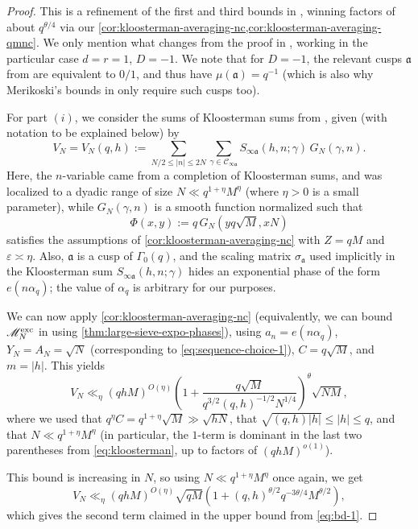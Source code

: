 \documentclass[reqno,11pt]{amsart}
\theoremstyle{remark}
\numberwithin{equation}{section}
\newcommand{\mC}{\mathcal{C}}
\newcommand{\ma}{\mathfrak{a}}
\newcommand{\eps}{\varepsilon}
\begin{document}
\begin{proof}
This is a refinement of the first and third bounds in \cite[Lemme 8.3]{de2020niveau}, winning factors of about $q^{\theta/4}$ via our \cref{cor:kloosterman-averaging-nc,cor:kloosterman-averaging-qmnc}. We only mention what changes from the proof in \cite[\S 8.1]{de2020niveau}, working in the particular case $d = r = 1$, $D = -1$. We note that for $D = -1$, the relevant cusps $\ma$ from \cite[\S 8.1]{de2020niveau} are equivalent to $0/1$, and thus have $\mu(\ma) = q^{-1}$ (which is also why Merikoski's bounds in \cite[\S 3.8]{merikoski2023largest} only require such cusps too). 

For part $(i)$, we consider the sums of Kloosterman sums from \cite[(8.30)]{de2020niveau}, given (with notation to be explained below) by
\[
    V_N = V_N(q, h) := \sum_{N/2 \le |n| \le 2N} \sum_{\gamma \in \mC_{\infty\ma}} S_{\infty\ma}(h, n; \gamma)\, G_N(\gamma, n).
\]
Here, the $n$-variable came from a completion of Kloosterman sums, and was localized to a dyadic range of size $N \ll q^{1+\eta} M^\eta$ (where $\eta > 0$ is a small parameter), while $G_N(\gamma, n)$ is a smooth function normalized such that
\[
    \Phi(x, y) := q\, G_N\left(yq\sqrt{M}, xN\right)
\]
satisfies the assumptions of \cref{cor:kloosterman-averaging-nc} with $Z = qM$ and $\eps \asymp \eta$. Also, $\ma$ is a cusp of $\Gamma_0(q)$, and the scaling matrix $\sigma_\ma$ used implicitly in the Kloosterman sum $S_{\infty\ma}(h, n; \gamma)$ hides an exponential phase of the form $e(n\alpha_q)$; the value of $\alpha_q$ is arbitrary for our purposes. 

We can now apply \cref{cor:kloosterman-averaging-nc} (equivalently, we can bound $\mathscr{M}_N^{\textnormal{exc}}$ in \cite[(8.40)]{de2020niveau} using \cref{thm:large-sieve-expo-phases}), using $a_n = e(n\alpha_q)$, $Y_N = A_N = \sqrt{N}$ (corresponding to \cref{eq:sequence-choice-1}), $C = q\sqrt{M}$, and $m = |h|$. This yields
\[
    V_N \ll_{\eta} (qhM)^{O(\eta)} \left(1 + \frac{q\sqrt{M}}{q^{3/2} (q, h)^{-1/2} N^{1/4}}\right)^{\theta} \sqrt{NM},
\]
where we used that $q^\eta C = q^{1+\eta}\sqrt{M} \gg \sqrt{hN}$, that $\sqrt{(q, h)|h|} \le |h| \le q$, and that $N \ll q^{1+\eta} M^\eta$ (in particular, the $1$-term is dominant in the last two parentheses from \cref{eq:kloosterman}, up to factors of $(qhM)^{o(1)}$). 

This bound is increasing in $N$, so using $N \ll q^{1+\eta} M^\eta$ once again, we get
\[
    V_N \ll_\eta (qhM)^{O(\eta)}  \sqrt{qM} \left(1 + (q, h)^{\theta/2} q^{-3\theta/4} M^{\theta/2}\right),
\]
which gives the second term claimed in the upper bound from \cref{eq:bd-1}.


\end{proof}
\end{document}
